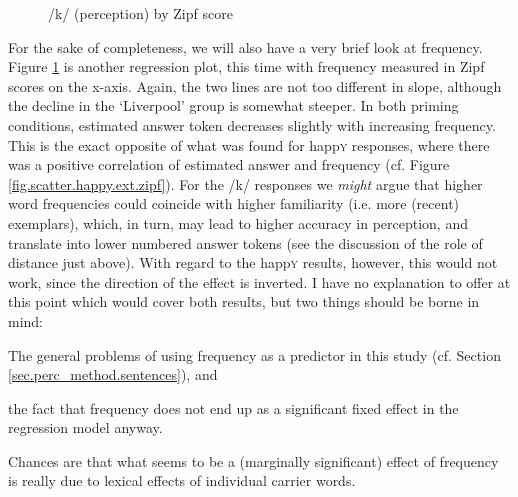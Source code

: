 \begin{figure}[h]
	\centering
		\resizebox{.49\linewidth}{!}{} 
	\caption{/k/ (perception) by Zipf score}
	\label{fig.scatter.k.ext.zipf}
\end{figure}

For the sake of completeness, we will also have a very brief look at frequency.
Figure \ref{fig.scatter.k.ext.zipf} is another regression plot, this time with frequency measured in Zipf scores on the x-axis.
Again, the two lines are not too different in slope, although the decline in the `Liverpool' group is somewhat steeper.
In both priming conditions, estimated answer token decreases slightly with increasing frequency.
This is the exact opposite of what was found for happ\textsc{y} responses, where there was a positive correlation of estimated answer and frequency (cf. Figure \ref{fig.scatter.happy.ext.zipf}).
For the /k/ responses we \emph{might} argue that higher word frequencies could coincide with higher familiarity (i.e. more (recent) exemplars), which, in turn, may lead to higher accuracy in perception, and translate into lower numbered answer tokens (see the discussion of the role of distance just above).
With regard to the happ\textsc{y} results, however, this would not work, since the direction of the effect is inverted.
I have no explanation to offer at this point which would cover both results, but two things should be borne in mind:
\begin{inparaenum}[(a)]
	\item The general problems of using frequency as a predictor in this study (cf. Section \ref{sec.perc_method.sentences}), and
	\item the fact that frequency does not end up as a significant fixed effect in the regression model anyway.
\end{inparaenum}
Chances are that what seems to be a (marginally significant) effect of frequency is really due to lexical effects of individual carrier words.